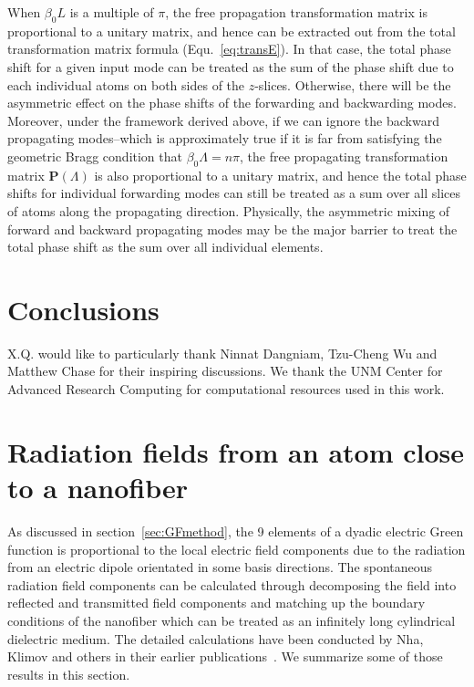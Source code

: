 \documentclass[preprint,aps,pra,onecolumn]{revtex4-1} %
\begin{document}
When $\beta_0 L$ is a multiple of $\pi$, the free propagation transformation matrix is proportional to a unitary matrix, and hence can be extracted out from the total transformation matrix formula (Equ.~\eqref{eq:transE}). In that case, the total phase shift for a given input mode can be treated as the sum of the phase shift due to each individual atoms on both sides of the $z$-slices. Otherwise, there will be the asymmetric effect on the phase shifts of the forwarding and backwarding modes. Moreover, under the framework derived above, if we can ignore the backward propagating modes--which is approximately true if it is far from satisfying the geometric Bragg condition that $ \beta_0\Lambda=n\pi $, the free propagating transformation matrix $\mathbf{P}(\Lambda)$ is also proportional to a unitary matrix, and hence the total phase shifts for individual forwarding modes can still be treated as a sum over all slices of atoms along the propagating direction. Physically, the asymmetric mixing of forward and backward propagating modes may be the major barrier to treat the total phase shift as the sum over all individual elements.  


\section{Conclusions}

\begin{acknowledgments}
X.Q. would like to particularly thank Ninnat Dangniam, Tzu-Cheng Wu and Matthew Chase for their inspiring discussions. We thank the UNM Center for Advanced Research Computing for computational resources used in this work.
\end{acknowledgments}

\appendix
\section{Radiation fields from an atom close to a nanofiber}\label{app:fieldcalculation}
As discussed in section~\ref{sec:GFmethod}, the 9 elements of a dyadic electric Green function is proportional to the local electric field components due to the radiation from an electric dipole orientated in some basis directions. The spontaneous radiation field components can be calculated through decomposing the field into reflected and transmitted field components and matching up the boundary conditions of the nanofiber which can be treated as an infinitely long cylindrical dielectric medium. The detailed calculations have been conducted by Nha, Klimov and others in their earlier publications~\cite{Nha1997,Klimov2004}. We summarize some of those results in this section. 
\end{document}
